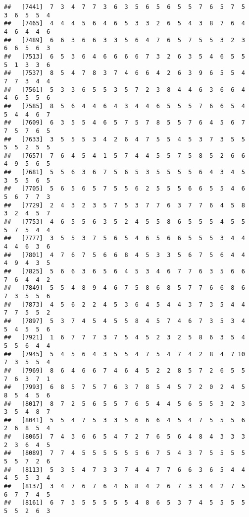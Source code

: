 \documentclass[
]{book}
\begin{document}
\begin{verbatim}
##   [7441]  7  3  4  7  7  3  6  3  5  6  5  6  5  5  7  6  5  7  5  3  6  5  5  4
##   [7465]  4  4  4  5  6  4  6  5  3  3  2  6  5  4  3  8  7  6  4  4  6  4  4  6
##   [7489]  6  6  3  6  6  3  3  5  6  4  7  6  5  7  5  5  3  2  3  6  6  5  6  3
##   [7513]  6  5  3  6  4  6  6  6  6  7  3  2  6  3  5  4  6  5  5  5  1  3  3  6
##   [7537]  8  5  4  7  8  3  7  4  6  6  4  2  6  3  9  6  5  5  4  7  7  3  4  4
##   [7561]  5  3  3  6  5  5  3  5  7  2  3  8  4  4  6  3  6  6  4  4  6  5  5  6
##   [7585]  8  5  6  4  4  6  4  3  4  4  6  5  5  5  7  6  6  5  4  5  4  4  6  7
##   [7609]  6  3  5  5  4  6  5  7  5  7  8  5  5  7  6  4  5  6  7  7  5  7  6  5
##   [7633]  3  5  5  5  3  4  2  6  4  7  5  5  4  5  3  7  3  5  5  5  5  2  5  5
##   [7657]  7  6  4  5  4  1  5  7  4  4  5  5  7  5  8  5  2  6  6  4  9  5  6  5
##   [7681]  5  5  6  3  6  7  5  6  5  3  5  5  5  5  6  4  3  4  5  3  5  5  6  5
##   [7705]  5  6  5  6  5  7  5  5  6  2  5  5  5  6  6  5  5  4  6  5  6  7  7  3
##   [7729]  2  4  3  2  3  5  7  5  3  7  7  6  3  7  7  6  4  5  8  3  2  4  5  7
##   [7753]  4  6  5  5  6  3  5  2  4  5  5  8  6  5  5  5  4  5  5  5  7  5  4  4
##   [7777]  3  5  5  3  7  5  6  5  4  6  5  6  6  5  5  5  3  4  4  4  4  6  3  6
##   [7801]  4  7  6  7  5  6  6  8  4  5  3  3  5  6  7  5  6  4  4  4  9  4  3  5
##   [7825]  5  6  6  3  6  5  6  4  5  3  4  6  7  7  6  3  5  6  6  7  6  4  4  2
##   [7849]  5  5  4  8  9  4  6  7  5  8  6  8  5  7  7  6  6  8  6  7  3  5  5  6
##   [7873]  4  5  6  2  2  4  5  3  6  4  5  4  4  3  7  3  5  4  4  7  7  5  5  2
##   [7897]  5  3  7  4  5  4  5  5  8  4  5  7  4  6  7  3  5  3  4  5  4  5  5  6
##   [7921]  1  6  7  7  7  3  7  5  4  5  2  3  2  5  8  6  3  5  4  5  5  6  4  4
##   [7945]  5  4  5  6  4  3  5  5  4  7  5  4  7  4  2  8  4  7 10  7  3  5  5  4
##   [7969]  8  6  4  6  6  7  4  6  4  5  2  2  8  5  7  2  6  5  5  7  6  3  7  1
##   [7993]  6  8  5  7  5  7  6  3  7  8  5  4  5  7  2  0  2  4  5  8  5  4  5  6
##   [8017]  8  7  2  5  6  5  5  7  6  5  4  4  5  6  5  5  3  2  3  3  5  4  8  7
##   [8041]  5  5  4  7  5  3  3  5  6  6  6  4  5  4  7  5  5  5  6  2  6  8  5  4
##   [8065]  7  4  3  6  6  5  4  7  2  7  6  5  6  4  8  4  3  3  3  2  3  6  4  5
##   [8089]  7  7  4  5  5  5  5  5  5  6  7  5  4  3  7  5  5  5  5  5  5  7  2  6
##   [8113]  5  3  5  4  7  3  3  7  4  4  7  7  6  6  3  6  5  4  4  4  5  5  3  4
##   [8137]  3  4  7  6  7  6  4  6  8  4  2  6  7  3  3  4  2  7  5  6  7  7  4  5
##   [8161]  6  7  3  5  5  5  5  5  4  8  6  5  3  7  4  5  5  5  5  5  5  2  6  3

\end{verbatim}
\end{document}

